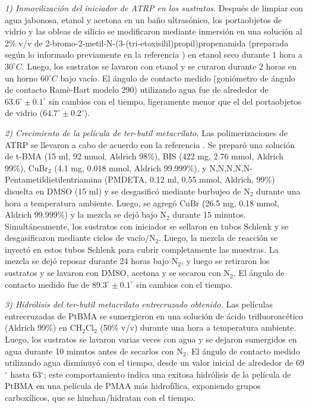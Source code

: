 \emph{1) Inmovilizaci\'on del iniciador de ATRP en los sustratos.}
 Despu\'es de limpiar con agua jabonosa, etanol y acetona en un ba\~no ultras\'onico, los portaobjetos de vidrio y las obleas de silicio se modificaron mediante inmersi\'on en una soluci\'on al 2\% v/v de 2-bromo-2-metil-N-(3-(tri-etoxisilil)propil)propenamida (preparada seg\'un lo informado previamente en la referencia \cite{Yameen2008}) en etanol seco durante 1 hora a $30^\circ C$. Luego, los sustratos se lavaron con etanol y se curaron durante 2 horas en un horno $60^\circ C$ bajo vac\'io. El \'angulo de contacto medido (goni\'ometro de \'angulo de contacto Ramè-Hart modelo 290) utilizando agua fue de alrededor de $63.6^\circ \pm 0.1^\circ$ sin cambios con el tiempo, ligeramente menor que el del portaobjetos de vidrio ($64.7^\circ \pm 0.2^\circ$).%




\emph{2) Crecimiento de la pel\'icula de ter-butil metacrilato.}
 Las polimerizaciones de ATRP se llevaron a cabo de acuerdo con la referencia \cite{Brown2009}. Se prepar\'o una soluci\'on de t-BMA (15 ml, 92 mmol, Aldrich 98\%), BIS (422 mg, 2.76 mmol, Aldrich 99\%), CuBr$_2$ (4.1 mg, 0.018 mmol, Aldrich 99.999\%), y N,N,N,N,N-Pentametildietilentriamina (PMDETA, 0.12 ml, 0.55 mmol, Aldrich, 99\%) disuelta en DMSO (15 ml) y se desgasific\'o mediante burbujeo de N$_2$ durante una hora a temperatura ambiente. Luego, se agreg\'o CuBr (26.5 mg, 0.18 mmol, Aldrich 99.999\%) y la mezcla se dej\'o bajo N$_2$ durante 15 minutos. Simult\'aneamente, los sustratos con iniciador se sellaron en tubos Schlenk y se desgasificaron mediante ciclos de vac\'io/N$_2$. Luego, la mezcla de reacci\'on se inyect\'o en estos tubos Schlenk para cubrir completamente las muestras. La mezcla se dej\'o reposar durante 24 horas bajo N$_2$, y luego se retiraron los sustratos y se lavaron con DMSO, acetona y se secaron con N$_2$. El \'angulo de contacto medido fue de $89.3^\circ \pm 0.1^\circ$ sin cambios con el tiempo.

\emph{3) Hidr\'olisis del ter-butil metacrilato entrecruzado obtenido.}
 Las pel\'iculas entrecruzadas de PtBMA se sumergieron en una soluci\'on de \'acido trifluoroac\'etico (Aldrich 99\%) en CH$_2$Cl$_2$ (50\% v/v) durante una hora a temperatura ambiente. Luego, los sustratos se lavaron varias veces con agua y se dejaron sumergidos en agua durante 10 minutos antes de secarlos con N$_2$. El \'angulo de contacto medido utilizando agua disminuy\'o con el tiempo, desde un valor inicial de alrededor de 69$^\circ$ hasta 63$^\circ$; este comportamiento indica una exitosa hidr\'olisis de la pel\'icula de PtBMA en una pel\'icula de PMAA m\'as hidrofílica, exponiendo grupos carbox\'ilicos, que se hinchan/hidratan con el tiempo.


